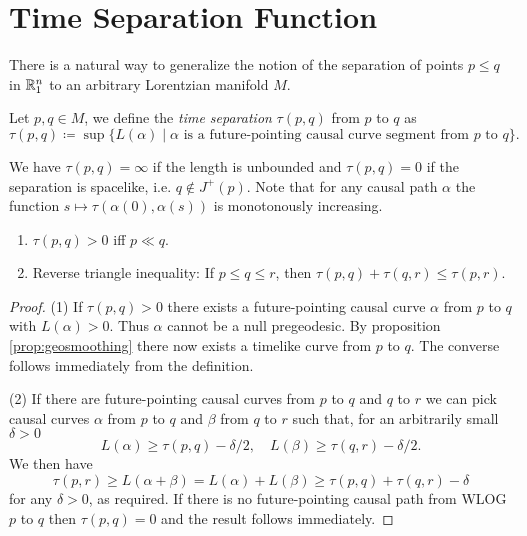 \section{Time Separation Function}
There is a natural way to generalize the notion of the separation of points $p\leq q$ in $\mathbb{R}^n_1$ to an arbitrary Lorentzian manifold $M$.
\begin{definition}
Let $p,q\in M$, we define the \emph{time separation} $\tau(p,q)$ from $p$ to $q$ as
\[
\tau(p,q)\coloneqq \sup \{L(\alpha) \mid \alpha \text{ is a future-pointing causal curve segment from }p \text{ to }q\}.
\]
\end{definition}
We have $\tau(p,q) = \infty$ if the length is unbounded and $\tau(p,q)=0$ if the separation is spacelike, i.e. $q\notin J^+(p)$.
Note that for any causal path $\alpha$ the function $s\mapsto \tau(\alpha(0),\alpha(s))$ is monotonously increasing.

\begin{lemma}
\begin{enumerate}[label={\textnormal{(\arabic*)}}]
    \item $\tau(p,q)>0$ iff $p\ll q$.
    \item Reverse triangle inequality: If $p\leq q\leq r$, then $\tau(p,q)+\tau(q,r)\leq \tau(p,r)$.
\end{enumerate}
\end{lemma}
\begin{proof}
(1) If $\tau(p,q)>0$ there exists a future-pointing causal curve $\alpha$ from $p$ to $q$ with $L(\alpha)>0$. Thus $\alpha$ cannot be a null pregeodesic. By proposition \ref{prop:geosmoothing} there now exists a timelike curve from $p$ to $q$. The converse follows immediately from the definition.

(2) If there are future-pointing causal curves from $p$ to $q$ and $q$ to $r$ we can pick causal curves $\alpha$ from $p$ to $q$ and $\beta$ from $q$ to $r$ such that, for an arbitrarily small $\delta>0$
\[
L(\alpha) \ge \tau(p,q)-\delta/2, \quad L(\beta) \ge \tau(q,r)-\delta/2.
\]
We then have 
\[
\tau(p,r) \ge L(\alpha+\beta) = L(\alpha) + L(\beta) \ge \tau(p,q) + \tau(q,r) - \delta
\] for any $\delta>0$, as required.
If there is no future-pointing causal path from WLOG $p$ to $q$ then $\tau(p,q)=0$ and the result follows immediately.
\end{proof}

